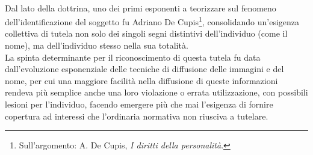 \\Dal lato della dottrina, uno dei primi esponenti a teorizzare sul fenomeno dell'identificazione del soggetto fu Adriano De Cupis\footnote{Sull'argomento: A. De Cupis, \textit{I diritti della personalità}.}, consolidando un'esigenza collettiva di tutela non solo dei singoli segni distintivi dell'individuo (come il nome), ma dell'individuo stesso nella sua totalità.
\\La spinta determinante per il riconoscimento di questa tutela fu data dall’evoluzione esponenziale delle tecniche di diffusione  delle immagini e del nome, per cui una maggiore facilità nella diffusione di queste informazioni rendeva più semplice anche una loro violazione o errata utilizzazione, con possibili lesioni per l'individuo, facendo emergere più che mai l’esigenza di fornire copertura ad interessi che l’ordinaria normativa non riusciva a tutelare.
